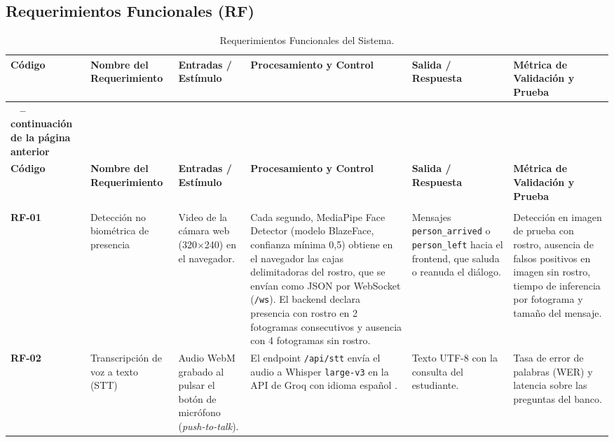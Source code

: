 \begin{landscape}
\subsection{Requerimientos Funcionales (RF)}

\begingroup
\small
\renewcommand{\arraystretch}{1.2}
\begin{xltabular}{\linewidth}{|>{\centering\arraybackslash}p{1.4cm}|>{\raggedright\arraybackslash{}\hsize}X|>{\raggedright\arraybackslash{}\hsize}X|>{\raggedright\arraybackslash{}\hsize}X|>{\raggedright\arraybackslash{}\hsize}X|>{\raggedright\arraybackslash{}\hsize}X|}
\caption{Requerimientos Funcionales del Sistema.}
\label{tab:rf_formal} \\
\hline
{}
\textbf{Código} & \textbf{Nombre del Requerimiento} & \textbf{Entradas / Estímulo} & \textbf{Procesamiento y Control} & \textbf{Salida / Respuesta} & \textbf{Métrica de Validación y Prueba} \\ \hline
\endfirsthead
{}%
{{\bfseries \tablename\ \thetable{} -- continuación de la página anterior}} \\
\hline
{}
\textbf{Código} & \textbf{Nombre del Requerimiento} & \textbf{Entradas / Estímulo} & \textbf{Procesamiento y Control} & \textbf{Salida / Respuesta} & \textbf{Métrica de Validación y Prueba} \\ \hline
\endhead
\hline {} \\ \hline
\endfoot
\endlastfoot
\textbf{RF-01} & Detección no biométrica de presencia & Video de la cámara web (320$\times$240) en el navegador. & Cada segundo, MediaPipe Face Detector (modelo BlazeFace, confianza mínima 0,5) obtiene en el navegador las cajas delimitadoras del rostro, que se envían como JSON por WebSocket (\texttt{/ws}). El backend declara presencia con rostro en 2 fotogramas consecutivos y ausencia con 4 fotogramas sin rostro. & Mensajes \texttt{person\_\allowbreak{}arrived} o \texttt{person\_left} hacia el frontend, que saluda o reanuda el diálogo. & Detección en imagen de prueba con rostro, ausencia de falsos positivos en imagen sin rostro, tiempo de inferencia por fotograma y tamaño del mensaje. \\ \hline
\textbf{RF-02} & Transcripción de voz a texto (STT) & Audio WebM grabado al pulsar el botón de micrófono (\textit{push-to-talk}). & El endpoint \texttt{/api/stt} envía el audio a Whisper \texttt{large-v3} en la API de Groq con idioma español \cite{radford2023whisper}. & Texto UTF-8 con la consulta del estudiante. & Tasa de error de palabras (WER) y latencia sobre las preguntas del banco. \\ \hline

\end{xltabular}
\end{landscape}
